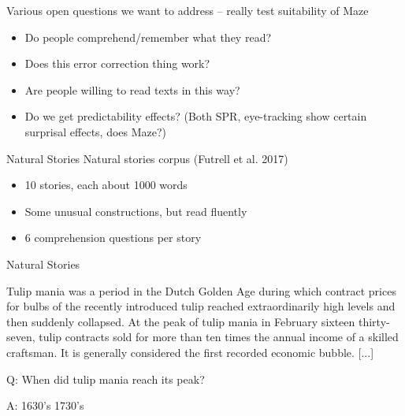 \documentclass[12pt, xcolor=beamer,table,usenames,dvipsnames, ignorenonframetext, ngerman]{beamer}
\begin{document}
%
\begin{frame}
	Various open questions we want to address -- really test suitability of Maze
	\begin{itemize}
		\item Do people comprehend/remember what they read?
		\item Does this error correction thing work? 
		\item Are people willing to read texts in this way? 
		\item Do we get predictability effects? (Both SPR, eye-tracking show certain surprisal effects, does Maze?)
	\end{itemize}
\end{frame}

\begin{frame}{Natural Stories}
Natural stories corpus (Futrell et al. 2017)
\begin{itemize}
	\item 10 stories, each about 1000 words
	\item Some unusual constructions, but read fluently
	\item 6 comprehension questions per story
\end{itemize}

\end{frame}

\begin{frame}{Natural Stories}

\begin{small}Tulip mania was a period in the Dutch Golden Age during which contract prices for bulbs of the recently introduced tulip reached extraordinarily high levels and then suddenly collapsed. At the peak of tulip mania in February sixteen thirty-seven, tulip contracts sold for more than ten times the annual income of a skilled craftsman. It is generally considered the first recorded economic bubble. [...]
\medskip

Q: When did tulip mania reach its peak?

A: \hspace{3em} 1630's\hspace{3em} 1730's \end{small}


\end{frame}
\end{document}
